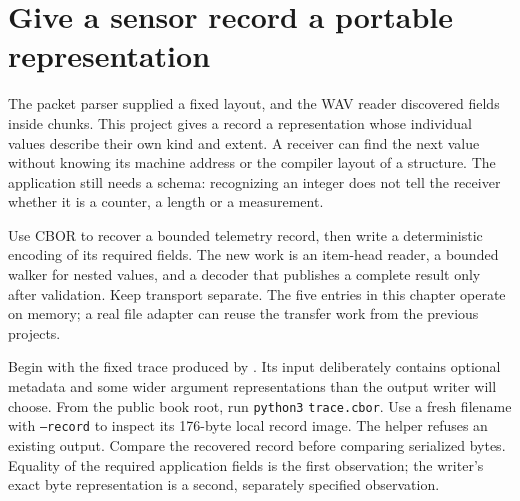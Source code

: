 \section{Give a sensor record a portable representation}
The packet parser supplied a fixed layout, and the WAV reader discovered fields inside
chunks. This project gives a record a representation whose individual values describe
their own kind and extent. A receiver can find the next value without knowing its
machine address or the compiler layout of a structure. The application still needs a
schema: recognizing an integer does not tell the receiver whether it is a counter,
a length or a measurement.

Use CBOR to recover a bounded telemetry record, then write a deterministic encoding of
its required fields. The new work is an item-head reader, a bounded walker for nested
values, and a decoder that publishes a complete result only after validation. Keep
transport separate. The five entries in this chapter operate on memory; a real file
adapter can reuse the transfer work from the previous projects.

Begin with the fixed trace produced by
. Its input deliberately contains optional metadata
and some wider argument representations than the output writer will choose. From the public book root, run
\texttt{python3}  \texttt{trace.cbor}.
Use a fresh filename with \texttt{--record} to inspect its 176-byte local record image.
The helper refuses an existing output. Compare
the recovered record before comparing serialized bytes. Equality of the required
application fields is the first observation; the writer's exact byte representation
is a second, separately specified observation.
